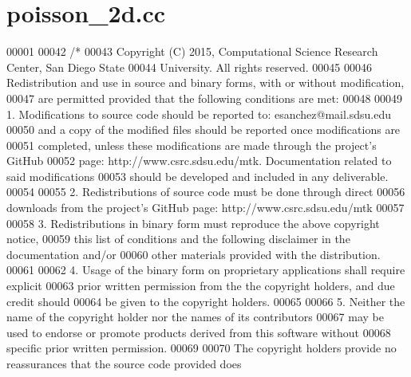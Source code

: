 \hypertarget{poisson__2d_8cc_source}{\section{poisson\+\_\+2d.\+cc}
\label{poisson__2d_8cc_source}
}

\begin{DoxyCode}
00001 
00042 \textcolor{comment}{/*}
00043 \textcolor{comment}{Copyright (C) 2015, Computational Science Research Center, San Diego State}
00044 \textcolor{comment}{University. All rights reserved.}
00045 \textcolor{comment}{}
00046 \textcolor{comment}{Redistribution and use in source and binary forms, with or without modification,}
00047 \textcolor{comment}{are permitted provided that the following conditions are met:}
00048 \textcolor{comment}{}
00049 \textcolor{comment}{1. Modifications to source code should be reported to: esanchez@mail.sdsu.edu}
00050 \textcolor{comment}{and a copy of the modified files should be reported once modifications are}
00051 \textcolor{comment}{completed, unless these modifications are made through the project's GitHub}
00052 \textcolor{comment}{page: http://www.csrc.sdsu.edu/mtk. Documentation related to said modifications}
00053 \textcolor{comment}{should be developed and included in any deliverable.}
00054 \textcolor{comment}{}
00055 \textcolor{comment}{2. Redistributions of source code must be done through direct}
00056 \textcolor{comment}{downloads from the project's GitHub page: http://www.csrc.sdsu.edu/mtk}
00057 \textcolor{comment}{}
00058 \textcolor{comment}{3. Redistributions in binary form must reproduce the above copyright notice,}
00059 \textcolor{comment}{this list of conditions and the following disclaimer in the documentation and/or}
00060 \textcolor{comment}{other materials provided with the distribution.}
00061 \textcolor{comment}{}
00062 \textcolor{comment}{4. Usage of the binary form on proprietary applications shall require explicit}
00063 \textcolor{comment}{prior written permission from the the copyright holders, and due credit should}
00064 \textcolor{comment}{be given to the copyright holders.}
00065 \textcolor{comment}{}
00066 \textcolor{comment}{5. Neither the name of the copyright holder nor the names of its contributors}
00067 \textcolor{comment}{may be used to endorse or promote products derived from this software without}
00068 \textcolor{comment}{specific prior written permission.}
00069 \textcolor{comment}{}
00070 \textcolor{comment}{The copyright holders provide no reassurances that the source code provided does}

\end{DoxyCode}
